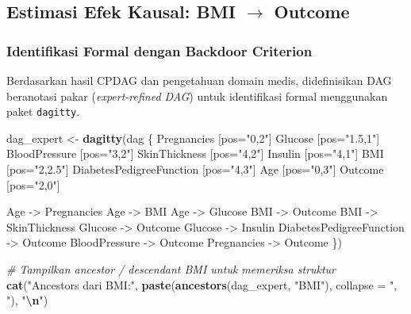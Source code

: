 \documentclass[
  11pt,
]{article}
\newenvironment{Shaded}{\begin{snugshade}}{\end{snugshade}}
\newcommand{\AttributeTok}[1]{\textcolor[rgb]{0.13,0.29,0.53}{#1}}
\newcommand{\CommentTok}[1]{\textcolor[rgb]{0.56,0.35,0.01}{\textit{#1}}}
\newcommand{\FunctionTok}[1]{\textcolor[rgb]{0.13,0.29,0.53}{\textbf{#1}}}
\newcommand{\NormalTok}[1]{#1}
\newcommand{\OtherTok}[1]{\textcolor[rgb]{0.56,0.35,0.01}{#1}}
\newcommand{\SpecialCharTok}[1]{\textcolor[rgb]{0.81,0.36,0.00}{\textbf{#1}}}
\newcommand{\StringTok}[1]{\textcolor[rgb]{0.31,0.60,0.02}{#1}}
\begin{document}
\subsection{\texorpdfstring{Estimasi Efek Kausal: BMI \(\rightarrow\)
Outcome}{Estimasi Efek Kausal: BMI \textbackslash rightarrow Outcome}}\label{estimasi-efek-kausal-bmi-rightarrow-outcome}

\subsubsection{Identifikasi Formal dengan Backdoor
Criterion}\label{identifikasi-formal-dengan-backdoor-criterion}

Berdasarkan hasil CPDAG dan pengetahuan domain medis, didefinisikan DAG
beranotasi pakar (\emph{expert-refined DAG}) untuk identifikasi formal
menggunakan paket \texttt{dagitty}.

\begin{Shaded}
\begin{Highlighting}[]
\NormalTok{dag\_expert }\OtherTok{\textless{}{-}} \FunctionTok{dagitty}\NormalTok{(}\StringTok{\textquotesingle{}dag \{}
\StringTok{  Pregnancies              [pos="0,2"]}
\StringTok{  Glucose                  [pos="1.5,1"]}
\StringTok{  BloodPressure            [pos="3,2"]}
\StringTok{  SkinThickness            [pos="4,2"]}
\StringTok{  Insulin                  [pos="4,1"]}
\StringTok{  BMI                      [pos="2,2.5"]}
\StringTok{  DiabetesPedigreeFunction [pos="4,3"]}
\StringTok{  Age                      [pos="0,3"]}
\StringTok{  Outcome                  [pos="2,0"]}

\StringTok{  Age {-}\textgreater{} Pregnancies}
\StringTok{  Age {-}\textgreater{} BMI}
\StringTok{  Age {-}\textgreater{} Glucose}
\StringTok{  BMI {-}\textgreater{} Outcome}
\StringTok{  BMI {-}\textgreater{} SkinThickness}
\StringTok{  Glucose {-}\textgreater{} Outcome}
\StringTok{  Glucose {-}\textgreater{} Insulin}
\StringTok{  DiabetesPedigreeFunction {-}\textgreater{} Outcome}
\StringTok{  BloodPressure {-}\textgreater{} Outcome}
\StringTok{  Pregnancies {-}\textgreater{} Outcome}
\StringTok{\}\textquotesingle{}}\NormalTok{)}

\CommentTok{\# Tampilkan ancestor / descendant BMI untuk memeriksa struktur}
\FunctionTok{cat}\NormalTok{(}\StringTok{"Ancestors dari BMI:"}\NormalTok{, }\FunctionTok{paste}\NormalTok{(}\FunctionTok{ancestors}\NormalTok{(dag\_expert, }\StringTok{"BMI"}\NormalTok{), }\AttributeTok{collapse =} \StringTok{", "}\NormalTok{), }\StringTok{"}\SpecialCharTok{\textbackslash{}n}\StringTok{"}\NormalTok{)}
\end{Highlighting}
\end{Shaded}
\end{document}
